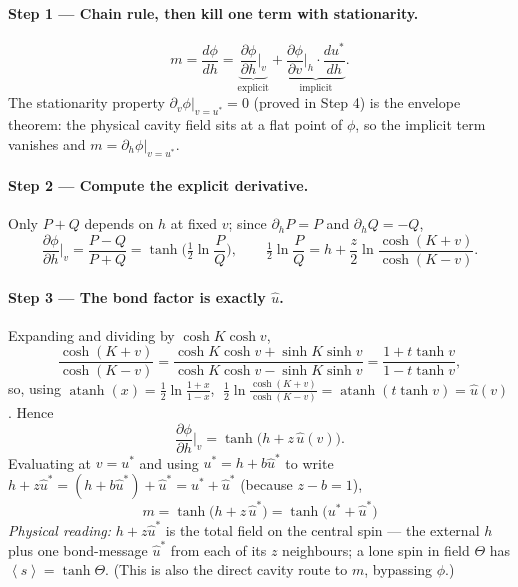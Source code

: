 \documentclass[11pt]{article}
\newcommand{\atanh}{\operatorname{atanh}}
\newcommand{\avg}[1]{\left\langle #1 \right\rangle}
\newcommand{\half}{\tfrac12}
\begin{document}
\paragraph{Step 1 --- Chain rule, then kill one term with stationarity.}
\begin{equation*}
m=\frac{d\phi}{dh}=\underbrace{\frac{\partial\phi}{\partial h}\Big|_{v}}_{\text{explicit}}
+\underbrace{\frac{\partial\phi}{\partial v}\Big|_{h}\cdot\frac{du^*}{dh}}_{\text{implicit}} .
\end{equation*}
The stationarity property $\partial_v\phi|_{v=u^*}=0$ (proved in Step 4) is the envelope theorem: the
physical cavity field sits at a flat point of $\phi$, so the implicit term vanishes and
$m=\partial_h\phi|_{v=u^*}$.

\paragraph{Step 2 --- Compute the explicit derivative.}
Only $P+Q$ depends on $h$ at fixed $v$; since $\partial_h P=P$ and $\partial_h Q=-Q$,
\begin{equation*}
\frac{\partial\phi}{\partial h}\Big|_v=\frac{P-Q}{P+Q}=\tanh\!\Big(\half\ln\frac PQ\Big),
\qquad
\half\ln\frac PQ=h+\frac z2\ln\frac{\cosh(K{+}v)}{\cosh(K{-}v)} .
\end{equation*}

\paragraph{Step 3 --- The bond factor is exactly $\hat u$.}
Expanding and dividing by $\cosh K\cosh v$,
\begin{equation*}
\frac{\cosh(K{+}v)}{\cosh(K{-}v)}
=\frac{\cosh K\cosh v+\sinh K\sinh v}{\cosh K\cosh v-\sinh K\sinh v}
=\frac{1+t\tanh v}{1-t\tanh v},
\end{equation*}
so, using $\atanh(x)=\half\ln\frac{1+x}{1-x}$, $\;\tfrac12\ln\frac{\cosh(K+v)}{\cosh(K-v)}=\atanh(t\tanh v)=\hat u(v)$. Hence
\begin{equation}
\frac{\partial\phi}{\partial h}\Big|_v=\tanh\!\big(h+z\,\hat u(v)\big).
\end{equation}
Evaluating at $v=u^*$ and using $u^*=h+b\hat u^*$ to write $h+z\hat u^*=(h+b\hat u^*)+\hat u^*=u^*+\hat u^*$ (because $z-b=1$),
\begin{equation}
\boxed{\;m=\tanh\!\big(h+z\,\hat u^*\big)=\tanh\!\big(u^*+\hat u^*\big)\;}
\end{equation}
\emph{Physical reading:} $h+z\hat u^*$ is the total field on the central spin --- the external $h$ plus
one bond-message $\hat u^*$ from each of its $z$ neighbours; a lone spin in field $\Theta$ has
$\avg{s}=\tanh\Theta$. (This is also the direct cavity route to $m$, bypassing $\phi$.)
\end{document}
